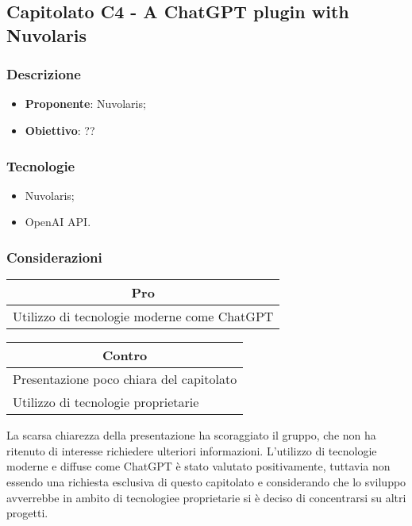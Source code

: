 \subsection{Capitolato C4 - A ChatGPT plugin with Nuvolaris}


\subsubsection{Descrizione}
\begin{itemize}
    \item \textbf{Proponente}: Nuvolaris;
    \item \textbf{Obiettivo}: ??
\end{itemize}


\subsubsection{Tecnologie}
\begin{itemize}
    \item Nuvolaris;
    \item OpenAI API.
\end{itemize}


\subsubsection{Considerazioni}
\begin{minipage}[t]{0.45\linewidth}
    \vspace{0pt}
    {\renewcommand{\arraystretch}{1.5}
    \begin{tabular}{p{1\linewidth}}
        \multicolumn{1}{c}{\textbf{Pro}} \\
        \midrule
        Utilizzo di tecnologie moderne come ChatGPT\\
        \hline
    \end{tabular}
    }
\end{minipage}
\hspace{0.05\linewidth}
\begin{minipage}[t]{0.45\linewidth}
    \vspace{0pt}
    {\renewcommand{\arraystretch}{1.5}
    \begin{tabular}{p{1\linewidth}}
        \multicolumn{1}{c}{\textbf{Contro}} \\
        \midrule
        Presentazione poco chiara del capitolato \\
        Utilizzo di tecnologie proprietarie \\
        \hline
    \end{tabular}
    }
\end{minipage}
\vspace{1em}

La scarsa chiarezza della presentazione ha scoraggiato il gruppo, che non ha ritenuto di interesse richiedere ulteriori informazioni.
L'utilizzo di tecnologie moderne e diffuse come ChatGPT è stato valutato positivamente, tuttavia non essendo una richiesta esclusiva di questo capitolato e considerando che lo sviluppo avverrebbe in ambito di tecnologiee proprietarie si è deciso di concentrarsi su altri progetti.